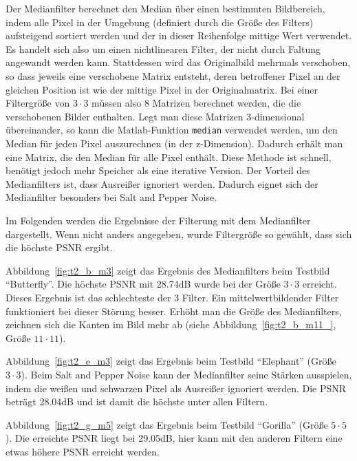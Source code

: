 Der Medianfilter berechnet den Median über einen bestimmten Bildbereich, indem alle Pixel in der Umgebung (definiert durch die Größe des Filters) aufsteigend sortiert werden und der in dieser Reihenfolge mittige Wert verwendet. Es handelt sich also um einen nichtlinearen Filter, der nicht durch Faltung angewandt werden kann. Stattdessen wird das Originalbild mehrmals verschoben, so dass jeweils eine verschobene Matrix entsteht, deren betroffener Pixel an der gleichen Position ist wie der mittige Pixel in der Originalmatrix. Bei einer Filtergröße von $3 \cdot 3$ müssen also 8 Matrizen berechnet werden, die die verschobenen Bilder enthalten. Legt man diese Matrizen 3-dimensional übereinander, so kann die Matlab-Funktion \texttt{median} verwendet werden, um den Median für jeden Pixel auszurechnen (in der z-Dimension). Dadurch erhält man eine Matrix, die den Median für alle Pixel enthält. Diese Methode ist schnell, benötigt jedoch mehr Speicher als eine iterative Version. Der Vorteil des Medianfilters ist, dass Ausreißer ignoriert werden. Dadurch eignet sich der Medianfilter besonders bei Salt and Pepper Noise.

\smallskip

Im Folgenden werden die Ergebnisse der Filterung mit dem Medianfilter dargestellt. Wenn nicht anders angegeben, wurde Filtergröße so gewählt, dass sich die höchste PSNR ergibt.

Abbildung~\ref{fig:t2_b_m3} zeigt das Ergebnis des Medianfilters beim Testbild ``Butterfly''. Die höchste PSNR mit 28.74dB wurde bei der Größe $3 \cdot 3$ erreicht. Dieses Ergebnis ist das schlechteste der 3 Filter. Ein mittelwertbildender Filter funktioniert bei dieser Störung besser. Erhöht man die Größe des Medianfilters, zeichnen sich die Kanten im Bild mehr ab (siehe Abbildung~\ref{fig:t2_b_m11_}, Größe $11 \cdot 11$).

Abbildung~\ref{fig:t2_e_m3} zeigt das Ergebnis beim Testbild ``Elephant'' (Größe $3 \cdot 3$). Beim Salt and Pepper Noise kann der Medianfilter seine Stärken ausspielen, indem die weißen und schwarzen Pixel als Ausreißer ignoriert werden. Die PSNR beträgt 28.04dB und ist damit die höchste unter allen Filtern.

Abbildung~\ref{fig:t2_g_m5} zeigt das Ergebnis beim Testbild ``Gorilla'' (Größe $5 \cdot 5$). Die erreichte PSNR liegt bei 29.05dB, hier kann mit den anderen Filtern eine etwas höhere PSNR erreicht werden.

\smallskip

